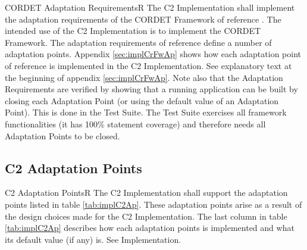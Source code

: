 \documentclass[a4paper,10pt]{article}
\newenvironment{fw_req}[6]
{\addtocounter{subsubsection}{1}
	\hspace{0.2cm}\textbf{CR-\arabic{section}.\arabic{subsection}.\arabic{subsubsection}/#2
	\hspace{0.8cm} #1}
	\vspace{-10pt}
\begin{longtable}{p{2.7cm}P{8.5cm}}
\hline
\textsc{Requirement} & #3 \\
\textsc{Justification} & #4 \\
\textsc{Implementation} & #5  \\ 
\textsc{Verification} & #6  \\
\hline
}
{\end{longtable}}
\begin{document}
\newpage
\begin{fw_req}{CORDET Adaptation Requirements}{R}
{The C2 Implementation shall implement the adaptation requirements of the CORDET Framework of reference \cite{ref:cordetfw}.}
{The intended use of the C2 Implementation is to implement the CORDET Framework.}
{The adaptation requirements of reference \cite{ref:cordetfw} define a number of adaptation points. Appendix \ref{sec:implCrFwAp} shows how each adaptation point of reference \cite{ref:cordetfw} is implemented in the C2 Implementation. } 
{See explanatory text at the beginning of appendix \ref{sec:implCrFwAp}. Note also that the Adaptation Requirements are verified by showing that a running application can be built by closing each Adaptation Point (or using the default value of an Adaptation Point). This is done in the Test Suite. The Test Suite exercises all framework functionalities (it has 100\% statement coverage) and therefore needs all Adaptation Points to be closed.}
\end{fw_req}

\subsection{C2 Adaptation Points}

\begin{fw_req}{C2 Adaptation Points}{R}
{The C2 Implementation shall support the adaptation points listed in table \ref{tab:implC2Ap}.}
{These adaptation points arise as a result of the design choices made for the C2 Implementation.}
{The last column in table \ref{tab:implC2Ap} describes how each adaptation points is implemented and what its default value (if any) is. } 
{See Implementation.}
\end{fw_req}
\end{document}
